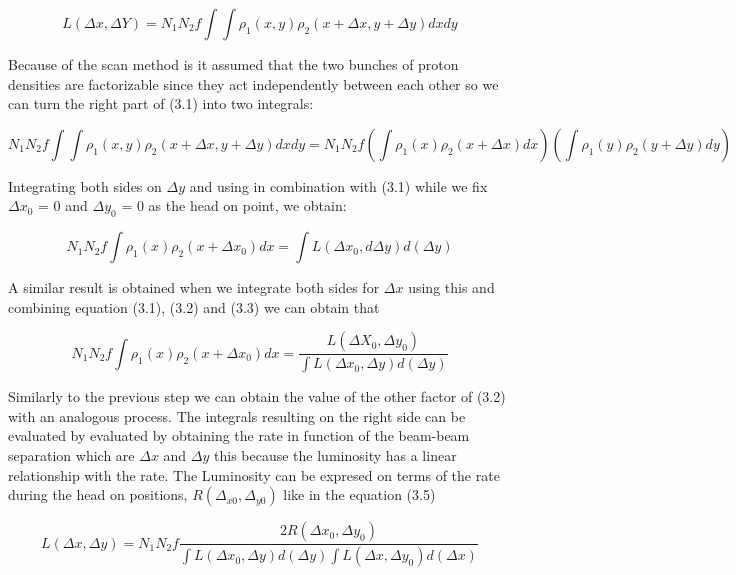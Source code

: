 \begin{equation}
 L(\Delta x, \Delta Y) = N_{1} N_{2} f  \int \int \rho_{1}(x,y)\rho_{2}(x+\Delta x, y+\Delta y) dxdy 
\end{equation}

Because of the scan method is it assumed that the two bunches of proton densities are factorizable since they act independently between each other so we can turn the right part of (3.1) into two integrals:

 \begin{equation}
N_{1} N_{2} f  \int \int \rho_{1}(x,y)\rho_{2}(x+\Delta x, y+\Delta y) dxdy   = N_{1} N_{2} f (\int \rho_{1}(x)\rho_{2}(x + \Delta x) dx) (\int \rho_{1}(y) \rho_{2}(y + \Delta y) dy)
\end{equation}

Integrating both sides on $\Delta y$ and using in combination with (3.1) while we fix $\Delta x_{0}$ = 0 and $\Delta y_{0}$ = 0 as the head on point,  we obtain:
 
 \begin{equation}
N_{1} N_{2} f \int \rho_{1}(x) \rho_{2}(x + \Delta x_{0}) dx = \int L (\Delta x_{0}, d\Delta y) d(\Delta y)
\end{equation}

A similar result is obtained when we integrate both sides for $\Delta x$ using this and combining equation (3.1), (3.2) and (3.3) we can obtain that 

\begin{equation}
N_{1} N_{2} f \int \rho_{1}(x) \rho_{2}(x + \Delta x_{0}) dx = \frac{L (\Delta X_{0}, \Delta y_{0})}{\int L(\Delta x_{0}, \Delta y) d(\Delta y)}
\end{equation}

Similarly to the previous step we can obtain the value of the other factor of (3.2) with an analogous process. The integrals resulting on the right side can be evaluated by evaluated by obtaining the rate in function of the beam-beam separation which are $\Delta x$ and $\Delta y$  this because the luminosity has a linear relationship with the rate. The Luminosity can be expresed on terms of the rate during the head on positions, $R(\Delta_{x0}, \Delta_{y0})$ like in the equation (3.5)

\begin{equation}
L(\Delta x, \Delta y) = N_{1} N_{2} f \frac{2R(\Delta x_{0}, \Delta y_{0})}{\int L(\Delta x_{0}, \Delta y) d(\Delta y) \int L(\Delta x, \Delta y_{0}) d(\Delta x)}
\end{equation}

